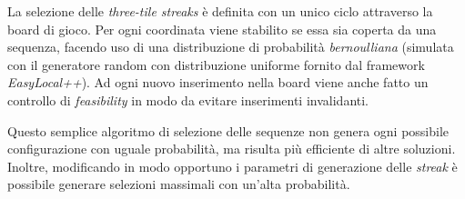     La selezione delle \emph{three-tile streaks} è definita con un unico ciclo attraverso la board di gioco. Per ogni coordinata viene stabilito se essa sia coperta da una sequenza, facendo uso di una distribuzione di probabilità \emph{bernoulliana} (simulata con il generatore random con distribuzione uniforme fornito dal framework \emph{EasyLocal++}). Ad ogni nuovo inserimento nella board viene anche fatto un controllo di \emph{feasibility} in modo da evitare inserimenti invalidanti.

    Questo semplice algoritmo di selezione delle sequenze non genera ogni possibile configurazione con uguale probabilità, ma risulta più efficiente di altre soluzioni. Inoltre, modificando in modo opportuno i parametri di generazione delle \emph{streak} è possibile generare selezioni massimali con un'alta probabilità.

